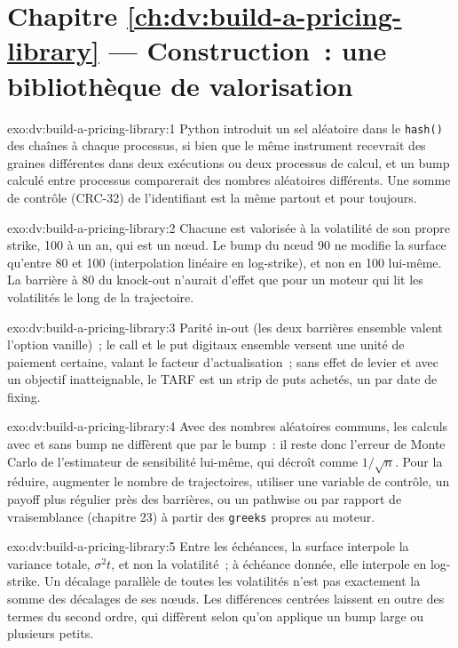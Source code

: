 \section*{Chapitre \ref{ch:dv:build-a-pricing-library} --- Construction~: une bibliothèque de valorisation}

\begin{solution}{exo:dv:build-a-pricing-library:1}
Python introduit un sel aléatoire dans le \texttt{hash()} des chaînes à chaque processus, si bien que le même instrument recevrait des graines différentes dans deux exécutions ou deux processus de calcul, et un bump
calculé entre processus comparerait des nombres aléatoires différents. Une somme de contrôle (CRC-32) de l'identifiant est la même partout et pour toujours.
\end{solution}

\begin{solution}{exo:dv:build-a-pricing-library:2}
Chacune est valorisée à la volatilité de son propre strike, 100 à un an, qui est un nœud. Le bump du nœud 90 ne modifie la surface
qu'entre 80 et 100 (interpolation linéaire en log-strike), et non en 100 lui-même. La barrière à 80 du knock-out n'aurait d'effet que pour un moteur qui lit les volatilités le long de la trajectoire.
\end{solution}

\begin{solution}{exo:dv:build-a-pricing-library:3}
Parité in-out (les deux barrières ensemble valent l'option vanille)~; le call et le put digitaux ensemble versent une unité de paiement certaine,
valant le facteur d'actualisation~; sans effet de levier et avec un objectif inatteignable, le TARF est un strip de puts achetés, un par date de fixing.
\end{solution}

\begin{solution}{exo:dv:build-a-pricing-library:4}
Avec des nombres aléatoires communs, les calculs avec et sans bump ne diffèrent que par le bump~: il reste donc l'erreur de Monte Carlo de l'estimateur
de sensibilité lui-même, qui décroît comme $1/\sqrt n$. Pour la réduire, augmenter le nombre de trajectoires, utiliser une variable de contrôle, un payoff plus régulier près des barrières, ou un  pathwise ou par rapport de vraisemblance (chapitre 23)
à partir des \texttt{greeks} propres au moteur.
\end{solution}

\begin{solution}{exo:dv:build-a-pricing-library:5}
Entre les échéances, la surface interpole la variance totale, $\sigma^2t$, et non la volatilité~; à échéance donnée, elle interpole en log-strike. Un décalage
parallèle de toutes les volatilités n'est pas exactement la somme des décalages de ses nœuds. Les différences centrées laissent en outre des termes du second ordre, qui diffèrent selon qu'on applique un bump
large ou plusieurs petits.
\end{solution}

